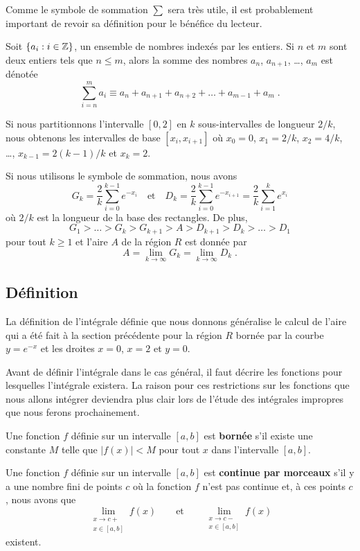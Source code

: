 {Comme le symbole de sommation $\displaystyle \sum$ sera très utile, il
est probablement important de revoir sa définition pour le bénéfice du
lecteur.

\begin{defn}
Soit $\{ a_i : i \in \mathbb{Z} \}$, un ensemble de nombres indexés par les
entiers.  Si $n$ et $m$ sont deux entiers tels que $n\leq m$, alors la
somme des nombres $a_n$, $a_{n+1}$, \ldots, $a_m$ est dénotée
\[
\sum_{i=n}^m a_i \equiv a_n + a_{n+1} + a_{n+2} + \ldots + a_{m-1} + a_m \; .
\]
\end{defn}

Si nous partitionnons l'intervalle $[0,2]$ en $k$ sous-intervalles de
longueur $2/k$, nous obtenons les intervalles de base $[x_i,x_{i+1}]$ où
$x_0=0$, $x_1=2/k$, $x_2=4/k$, \ldots, $x_{k-1} = 2(k-1)/k$ et
$x_k= 2$. 

Si nous utilisons le symbole de sommation, nous avons
\[
G_k = \frac{2}{k} \sum_{i=0}^{k-1} e^{-x_i}
\quad \text{et} \quad
D_k = \frac{2}{k} \sum_{i=0}^{k-1} e^{-x_{i+1}}
= \frac{2}{k} \sum_{i=1}^{k} e^{x_i}
\]
où $2/k$ est la longueur de la base des rectangles.  De plus,
\[
G_1 > \ldots > G_{k} > G_{k+1} > A > D_{k+1} > D_{k} > \ldots > D_1
\]
pour tout $k\geq 1$ et l'aire $A$ de la région $R$ est donnée par
\[
A= \lim_{k\rightarrow \infty} G_k = \lim_{k\rightarrow \infty} D_k \; .
\]

\subsection{Définition}

La définition de l'intégrale définie que nous donnons généralise le
calcul de l'aire qui a été fait à la section précédente pour la région
$R$ bornée par la courbe $y=e^{-x}$ et les droites $x=0$, $x=2$ et
$y=0$.

Avant de définir l'intégrale dans le cas général, il faut décrire
les fonctions pour lesquelles l'intégrale existera.  La raison pour
ces restrictions sur les fonctions que nous allons intégrer deviendra
plus clair lors de l'étude des intégrales impropres que nous ferons
prochainement.

\begin{defn}
Une fonction $f$ définie sur un intervalle $[a,b]$ est
{\bfseries bornée} s'il existe une constante
$M$ telle que $|f(x)|<M$ pour tout $x$ dans l'intervalle $[a,b]$.

Une fonction $f$ définie sur un intervalle $[a,b]$ est
{\bfseries continue par morceaux} s'il y a une nombre fini de points $c$ où la fonction $f$
n'est pas continue et, à ces points $c$, nous avons que
\[
\lim_{\substack{x\rightarrow c+\\ x\in[a,b]}} f(x)
\qquad \text{et} \qquad
\lim_{\substack{x\rightarrow c-\\ x\in[a,b]}} f(x)
\]
existent.
\end{defn}

}
